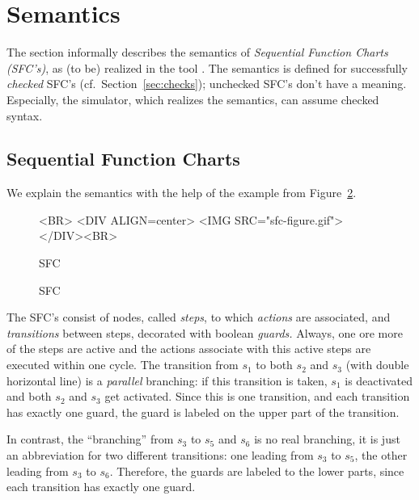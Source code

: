 \section{Semantics}
\label{sec:semantics}

The section informally describes the semantics of \textit{Sequential
  Function Charts (SFC's)}, as (to be) realized in the tool \Slime.  The
semantics is defined for successfully \emph{checked} SFC's (cf.\ 
Section~\ref{sec:checks}); unchecked SFC's don't have a meaning.
Especially, the simulator, which realizes the semantics, can assume checked
syntax.



\subsection{Sequential Function Charts}

We explain the semantics with the help of the example from
Figure~\ref{fig:SFC}.


\ifweb
\begin{figure}[htbp]
  \centering
  \begin{rawhtml}
    <BR>
    <DIV ALIGN=center>
    <IMG SRC="sfc-figure.gif">
    </DIV><BR>  
  \end{rawhtml}  
  \caption{SFC}
  \label{fig:SFC}
\end{figure}

\else
\begin{figure}[htbp]
  \centering
  
  \caption{SFC}
  \label{fig:SFC}
\end{figure}

\fi


The SFC's consist of nodes, called \emph{steps}, to which \emph{actions} are
associated, and \emph{transitions} between steps, decorated with boolean
\emph{guards.} Always, one ore more of the steps are active and the actions
associate with this active steps are executed within one cycle.  The
transition from $s_1$ to both $s_2$ and $s_3$ (with double horizontal line) is
a \emph{parallel} branching: if this transition is taken, $s_1$ is deactivated
and both $s_2$ and $s_3$ get activated.  Since this is one transition, and
each transition has exactly one guard, the guard is labeled on the upper part
of the transition.

In contrast, the ``branching'' from $s_3$ to $s_5$ and $s_6$ is no real
branching, it is just an abbreviation for two different transitions: one
leading from $s_3$ to $s_5$, the other leading from $s_3$ to $s_6$.
Therefore, the guards are labeled to the lower parts, since each transition
has exactly one guard.

